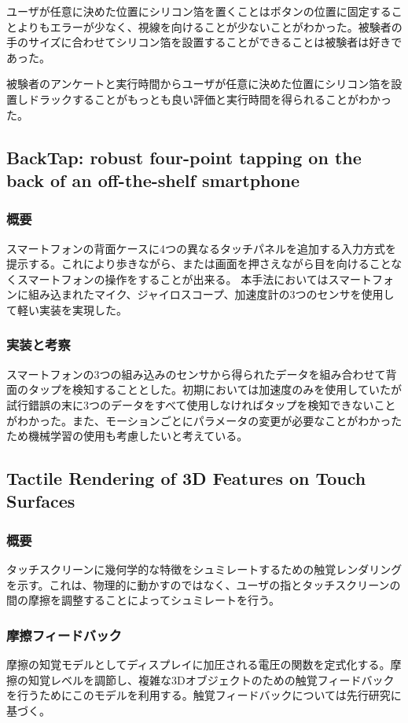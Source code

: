 \documentclass[11pt,a4paper]{jarticle}
\begin{document}
ユーザが任意に決めた位置にシリコン箔を置くことはボタンの位置に固定することよりもエラーが少なく、視線を向けることが少ないことがわかった。被験者の手のサイズに合わせてシリコン箔を設置することができることは被験者は好きであった。

被験者のアンケートと実行時間からユーザが任意に決めた位置にシリコン箔を設置しドラックすることがもっとも良い評価と実行時間を得られることがわかった。

\subsection{BackTap: robust four-point tapping on the back of an off-the-shelf smartphone\cite{Zhang:2013}}
\subsubsection{概要}
スマートフォンの背面ケースに4つの異なるタッチパネルを追加する入力方式を提示する。これにより歩きながら、または画面を押さえながら目を向けることなくスマートフォンの操作をすることが出来る。
本手法においてはスマートフォンに組み込まれたマイク、ジャイロスコープ、加速度計の3つのセンサを使用して軽い実装を実現した。

\subsubsection{実装と考察}
スマートフォンの3つの組み込みのセンサから得られたデータを組み合わせて背面のタップを検知することとした。初期においては加速度のみを使用していたが試行錯誤の末に3つのデータをすべて使用しなければタップを検知できないことがわかった。また、モーションごとにパラメータの変更が必要なことがわかったため機械学習の使用も考慮したいと考えている。

\subsection{Tactile Rendering of 3D Features on Touch Surfaces\cite{Kim:2013}}
\subsubsection{概要}
タッチスクリーンに幾何学的な特徴をシュミレートするための触覚レンダリングを示す。これは、物理的に動かすのではなく、ユーザの指とタッチスクリーンの間の摩擦を調整することによってシュミレートを行う。

\subsubsection{摩擦フィードバック}
摩擦の知覚モデルとしてディスプレイに加圧される電圧の関数を定式化する。摩擦の知覚レベルを調節し、複雑な3Dオブジェクトのための触覚フィードバックを行うためにこのモデルを利用する。触覚フィードバックについては先行研究に基づく。
\end{document}
